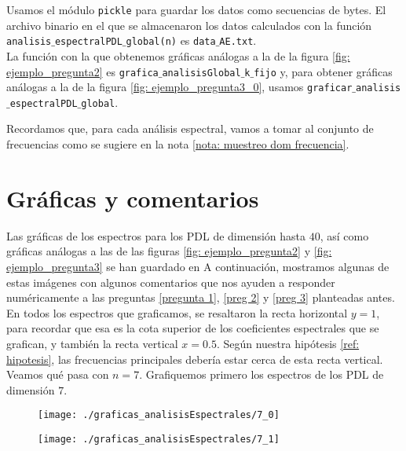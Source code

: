 Usamos el 
módulo \texttt{pickle} para guardar los datos como secuencias
de bytes. El archivo binario en el que se almacenaron los
datos calculados con la función 
\texttt{analisis$\_$espectralPDL$\_$global(n)}
es \texttt{data$\_$AE.txt}. \\

La función con la que obtenemos gráficas análogas 
a la de la figura 
\ref{fig: ejemplo_pregunta2} es
\texttt{grafica$\_$analisisGlobal$\_$k$\_$fijo}
y, para obtener gráficas análogas a la de la figura
\ref{fig: ejemplo_pregunta3_0},
usamos \texttt{graficar$\_$analisis$\_$espectralPDL$\_$global}.

Recordamos que,
para cada análisis espectral,
vamos a tomar al conjunto de 
frecuencias 
como se sugiere en la nota \ref{nota: muestreo dom frecuencia}.

\section{Gráficas y comentarios}
Las gráficas de los espectros
para los PDL de dimensión hasta $40$, así
como gráficas análogas a las de las figuras
\ref{fig: ejemplo_pregunta2}
y 
\ref{fig: ejemplo_pregunta3}
se han guardado en 
A continuación, mostramos algunas
de estas imágenes con algunos comentarios
que nos ayuden a responder numéricamente a 
las preguntas
\ref{pregunta 1}, \ref{preg 2} y \ref{preg 3}
planteadas antes. \\

En todos los espectros que graficamos,
se resaltaron la recta horizontal
$y = 1$, para recordar que esa es la cota
superior de los coeficientes espectrales que
se grafican, 
y también la recta vertical $x = 0.5$. Según nuestra
hipótesis \ref{ref: hipotesis}, las frecuencias
principales debería estar cerca de esta recta vertical. \\

Veamos qué pasa con $n=7$.
Grafiquemos primero los espectros
de los PDL de dimensión $7$.

\begin{figure}[H]
	\sidecaption{
	\label{fig: 7_0}
	}
	\centering
	\texttt{[image: ./graficas\_analisisEspectrales/7\_0]} 
\end{figure}	

\begin{figure}[H]
	\sidecaption{
	\label{fig: 7_1}
	}
	\centering
	\texttt{[image: ./graficas\_analisisEspectrales/7\_1]} 
\end{figure}	

